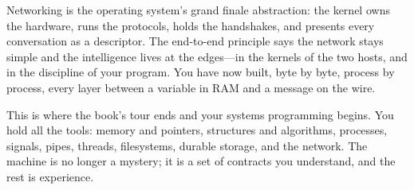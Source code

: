 \begin{osconcept}
Networking is the operating system's grand finale abstraction: the
kernel owns the hardware, runs the protocols, holds the handshakes,
and presents every conversation as a descriptor. The end-to-end
principle says the network stays simple and the intelligence lives at
the edges---in the kernels of the two hosts, and in the discipline of
your program. You have now built, byte by byte, process by process,
every layer between a variable in RAM and a message on the wire.
\end{osconcept}

This is where the book's tour ends and your systems programming begins.
You hold all the tools: memory and pointers, structures and algorithms,
processes, signals, pipes, threads, filesystems, durable storage, and
the network. The machine is no longer a mystery; it is a set of
contracts you understand, and the rest is experience.

